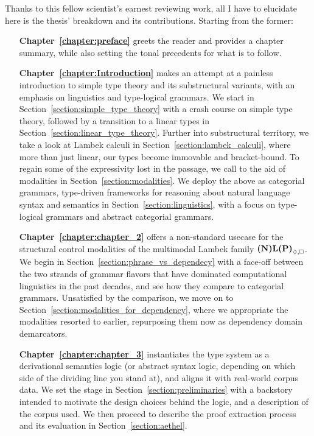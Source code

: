 {Thanks to this fellow scientist's earnest reviewing work, all I have to elucidate here is the thesis' breakdown and its contributions. Starting from the former:
\begin{enumerate}[labelindent=2pt, itemindent=30pt, labelsep=5pt, widest=Chapter III,align=right,itemsep=5pt]
\item[\textbf{Chapter~\ref{chapter:preface}}] greets the reader and provides a chapter summary, while also setting the tonal precedents for what is to follow.
\item[\textbf{Chapter~\ref{chapter:Introduction}}] makes an attempt at a painless introduction to simple type theory and its substructural variants, with an emphasis on linguistics and type-logical grammars.
We start in Section~\ref{section:simple_type_theory} with a crash course on simple type theory, followed by a transition to a linear types in Section~\ref{section:linear_type_theory}.
Further into substructural territory, we take a look at Lambek calculi in Section~\ref{section:lambek_calculi}, where more than just linear, our types become immovable and bracket-bound.
To regain some of the expressivity lost in the passage, we call to the aid of modalities in Section~\ref{section:modalities}.
We deploy the above as categorial grammars, type-driven frameworks for reasoning about natural language syntax and semantics in Section~\ref{section:linguistics}, with a focus on type-logical grammars and abstract categorial grammars.
\item[\textbf{Chapter~\ref{chapter:chapter_2}}] offers a non-standard usecase for the structural control modalities of the multimodal Lambek family $\logic{(N)L(P)}_{\diamond, \bx}$.
We begin in Section~\ref{section:phrase_vs_dependecy} with a face-off between the two strands of grammar flavors that have dominated computational linguistics in the past decades, and see how they compare to categorial grammars.
Unsatisfied by the comparison, we move on to Section~\ref{section:modalities_for_dependency}, where we appropriate the modalities resorted to earlier, repurposing them now as dependency domain demarcators.
\item[\textbf{Chapter~\ref{chapter:chapter_3}}] instantiates the type system as a derivational semantics logic (or abstract syntax logic, depending on which side of the dividing line you stand at), and aligns it with real-world corpus data. 
We set the stage in Section~\ref{section:preliminaries} with a backstory intended to motivate the design choices behind the logic, and a description of the corpus used.
We then proceed to describe the proof extraction process and its evaluation in Section~\ref{section:aethel}.

\end{enumerate}}

